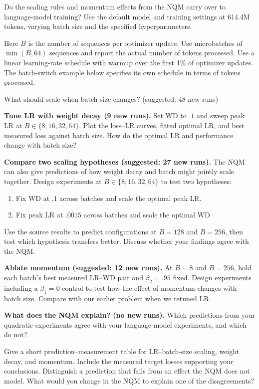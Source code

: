 \clearpage
{}

Do the scaling rules and momentum effects from the NQM carry over to
language-model training? Use the default model and training settings at
614.4M tokens, varying batch size and the specified hyperparameters.

Here $B$ is the number of sequences per optimizer update. Use microbatches of
$\min(B,64)$ sequences and report the actual number of tokens processed.
Use a linear learning-rate schedule with warmup over the first 1\% of
optimizer updates. The batch-switch example below specifies its own
schedule in terms of tokens processed.


\begin{problem}{What should scale when batch size changes? (suggested: 48 new runs)}
\begin{parts}
\item \textbf{Tune LR with weight decay (9 new runs).}
Set WD to $.1$ and sweep peak LR at $B\in\{8,16,32,64\}$.
Plot the loss--LR curves, fitted optimal LR, and best measured loss against
batch size. How do the optimal LR and performance change with batch size?

\item \textbf{Compare two scaling hypotheses (suggested: 27 new runs).}
The NQM can also give predictions of how weight decay and batch might jointly scale together.
Design experiments at $B\in\{8,16,32,64\}$ to test two hypotheses:
\begin{enumerate}[label=\roman*.]
\item Fix WD at $.1$ across batches and scale the optimal peak LR.
\item Fix peak LR at $.0015$ across batches and scale the optimal WD.
\end{enumerate}
Use the source results to predict configurations at $B=128$ and $B=256$,
then test which hypothesis transfers better. Discuss whether your findings
agree with the NQM.

\item \textbf{Ablate momentum (suggested: 12 new runs).}
At $B=8$ and $B=256$, hold each batch's best measured LR--WD pair and
$\beta_2=.95$ fixed. Design experiments including a $\beta_1=0$ control to test how the effect of momentum changes with batch size.
Compare with our earlier problem when we retuned LR.

\item \textbf{What does the NQM explain? (no new runs).}
Which predictions from your quadratic experiments agree with your language-model experiments,
and which do not?

Give a short prediction--measurement table for LR--batch-size scaling,
weight decay, and momentum. Include the measured target losses supporting
your conclusions. Distinguish a prediction that fails from an effect
the NQM does not model. What would you change in the NQM to explain one of
the disagreements?
\end{parts}
\end{problem}

